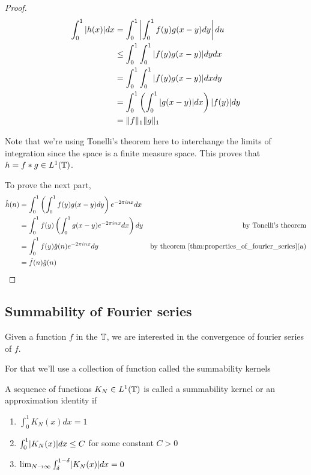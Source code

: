   \begin{proof}
    \begin{align*}
  \int_{0}^{1} |h(x)| dx &= \int_{0}^{1} \left| \int_{0}^{1} f(y)g(x-y) dy \right| du \\
                         &\le \int_{0}^{1} \int_{0}^{1} |f(y)g(x-y)| dy dx \\
                         &= \int_{0}^{1} \int_{0}^{1} |f(y)g(x-y)| dx dy \\
                         &= \int_{0}^{1} \left( \int_{0}^{1} |g(x-y)| dx \right) |f(y)|dy \\
                         &=\lVert f\rVert_1 \lVert g\rVert_1
    \end{align*}

    Note that we're using Tonelli's theorem here to interchange the limits of integration since the space is a finite measure space. This proves that $h = f*g \in L^1(\mathbb T)$.

    To prove the next part,
    \begin{align*}
      \hat{h}(n) &= \int_0^1 \left( \int_0^1 f(y)g(x-y)dy \right) e^{-2\pi in x} dx \\
               &= \int_0^1 f(y) \left( \int_0^1 g(x-y) e^{-2\pi in x}dx \right) dy & \text{by Tonelli's theorem}\\  
               &= \int_0^1 f(y) \hat{g}(n)e^{-2\pi inx} dy & \text{by theorem } \ref{thm:properties_of_fourier_series} \text{(a)}\\
               &= \hat{f}(n)\hat{g}(n)
    \end{align*}
  \end{proof}
 

  \subsection{Summability of Fourier series}
  Given a function $f$ in the $\mathbb T$, we are interested in the convergence of fourier series of $f$.

  For that we'll use a collection of function called the summability kernels
  \begin{definition}
    \label{def:summability_kernel}
    A sequence of functions $K_N \in L^1(\mathbb T)$ is called a summability kernel or an approximation identity if 
    \begin{enumerate}[label=(\alph*)]
      \item $\int_{0}^{1}K_N(x)dx = 1$
      \item $\int_{0}^{1}\lvert K_N(x)\rvert dx \le C$ for some constant $C>0$
      \item $\lim_{N\to\infty} \int_{\delta}^{1-\delta}\lvert K_N(x)\rvert dx= 0$
    \end{enumerate}
  \end{definition}
 

